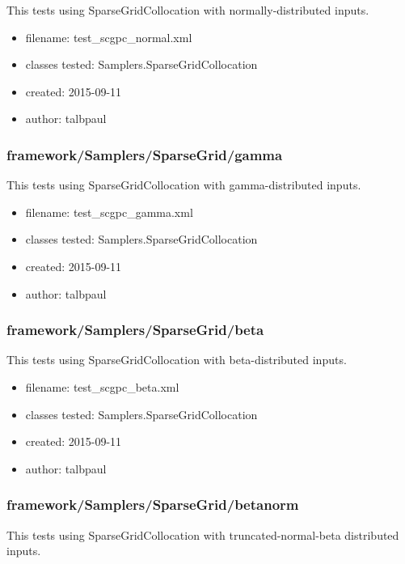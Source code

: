       This tests using SparseGridCollocation with normally-distributed inputs.
    
      \begin{itemize}
          \item filename: test\_scgpc\_normal.xml
          \item classes tested: Samplers.SparseGridCollocation
          \item created: 2015-09-11
          \item author: talbpaul
      \end{itemize}
    \subsubsection{framework/Samplers/SparseGrid/gamma}
      
      This tests using SparseGridCollocation with gamma-distributed inputs.
    
      \begin{itemize}
          \item filename: test\_scgpc\_gamma.xml
          \item classes tested: Samplers.SparseGridCollocation
          \item created: 2015-09-11
          \item author: talbpaul
      \end{itemize}
    \subsubsection{framework/Samplers/SparseGrid/beta}
      
      This tests using SparseGridCollocation with beta-distributed inputs.
    
      \begin{itemize}
          \item filename: test\_scgpc\_beta.xml
          \item classes tested: Samplers.SparseGridCollocation
          \item created: 2015-09-11
          \item author: talbpaul
      \end{itemize}
    \subsubsection{framework/Samplers/SparseGrid/betanorm}
      
      This tests using SparseGridCollocation with truncated-normal-beta distributed inputs.
    
